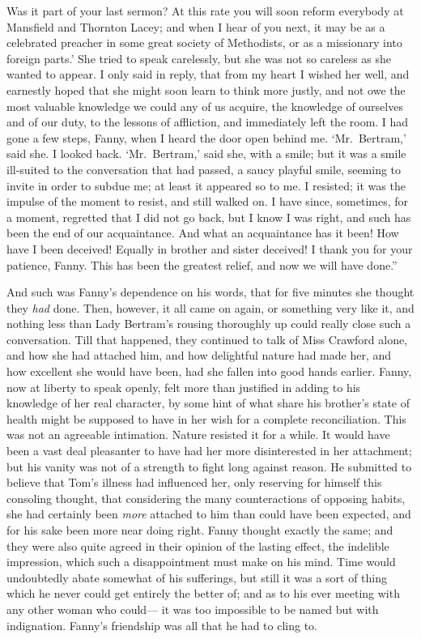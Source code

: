 \documentclass{article}
\begin{document}
Was it part of your last sermon?  At this rate you will
soon reform everybody at Mansfield and Thornton Lacey;
and when I hear of you next, it may be as a celebrated preacher
in some great society of Methodists, or as a missionary
into foreign parts.'  She tried to speak carelessly,
but she was not so careless as she wanted to appear.
I only said in reply, that from my heart I wished her well,
and earnestly hoped that she might soon learn to think
more justly, and not owe the most valuable knowledge we
could any of us acquire, the knowledge of ourselves and of
our duty, to the lessons of affliction, and immediately
left the room.  I had gone a few steps, Fanny, when I
heard the door open behind me.  `Mr.\ Bertram,' said she.
I looked back.  `Mr.\ Bertram,' said she, with a smile;
but it was a smile ill-suited to the conversation that
had passed, a saucy playful smile, seeming to invite
in order to subdue me; at least it appeared so to me.
I resisted; it was the impulse of the moment to resist,
and still walked on.  I have since, sometimes, for a moment,
regretted that I did not go back, but I know I was right,
and such has been the end of our acquaintance.  And what
an acquaintance has it been!  How have I been deceived!
Equally in brother and sister deceived!  I thank you for
your patience, Fanny.  This has been the greatest relief,
and now we will have done.''

And such was Fanny's dependence on his words, that for five
minutes she thought they \emph{had} done.  Then, however, it all
came on again, or something very like it, and nothing
less than Lady Bertram's rousing thoroughly up could
really close such a conversation.  Till that happened,
they continued to talk of Miss Crawford alone, and how she
had attached him, and how delightful nature had made her,
and how excellent she would have been, had she fallen into
good hands earlier.  Fanny, now at liberty to speak openly,
felt more than justified in adding to his knowledge
of her real character, by some hint of what share his
brother's state of health might be supposed to have in
her wish for a complete reconciliation.  This was not an
agreeable intimation.  Nature resisted it for a while.
It would have been a vast deal pleasanter to have had
her more disinterested in her attachment; but his vanity
was not of a strength to fight long against reason.
He submitted to believe that Tom's illness had influenced her,
only reserving for himself this consoling thought,
that considering the many counteractions of opposing habits,
she had certainly been \emph{more} attached to him than could
have been expected, and for his sake been more near
doing right.  Fanny thought exactly the same; and they were
also quite agreed in their opinion of the lasting effect,
the indelible impression, which such a disappointment
must make on his mind.  Time would undoubtedly abate
somewhat of his sufferings, but still it was a sort
of thing which he never could get entirely the better of;
and as to his ever meeting with any other woman who could---%
it was too impossible to be named but with indignation.
Fanny's friendship was all that he had to cling to.
\end{document}
